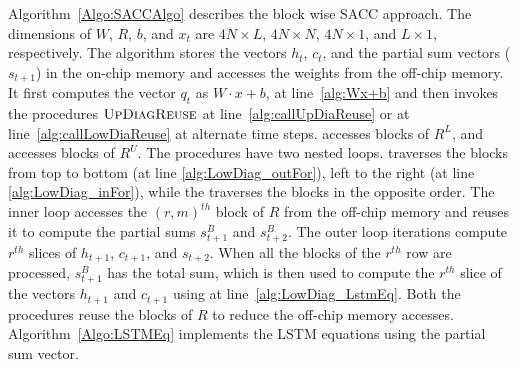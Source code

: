 Algorithm~\ref{Algo:SACCAlgo} describes the block wise SACC approach. The dimensions of $W$, $R$, $b$, and $x_t$ are $4N{\times}L$, $4N{\times}N$, $4N{\times}1$, and $L{\times}1$, respectively. The algorithm stores the vectors $h_t$, $c_t$, and the partial sum vectors ($s_{t+1}$) in the on-chip memory and accesses the weights from the off-chip memory. It first computes the vector $q_t$ as $W{\cdot}x{+}b$, at line~\ref{alg:Wx+b} and then invokes the procedures $\textproc{UpDiagReuse}$ at line~\ref{alg:callUpDiaReuse} or   at line~\ref{alg:callLowDiaReuse} at alternate time steps.  accesses blocks of $R^L$, and  accesses blocks of $R^U$. The procedures have two nested loops.  traverses the blocks from top to bottom (at line \ref{alg:LowDiag_outFor}), left to the right (at line \ref{alg:LowDiag_inFor}), while the  traverses the blocks in the opposite order. The inner loop accesses the $(r,m)^{th}$ block of $R$ from the off-chip memory and reuses it to compute the partial sums $s^B_{t+1}$ and $s^B_{t+2}$. The outer loop iterations compute $r^{th}$ slices of $h_{t+1}$, $c_{t+1}$, and $s_{t+2}$.
When all the blocks of the $r^{th}$ row are processed, $s^B_{t+1}$ has the total sum, which is then used to compute the $r^{th}$ slice of the vectors $h_{t+1}$ and $c_{t+1}$ using  at line~\ref{alg:LowDiag_LstmEq}. 
Both the procedures reuse the blocks of $R$ to reduce the off-chip memory accesses. Algorithm~\ref{Algo:LSTMEq} implements the LSTM equations using the partial sum vector.

